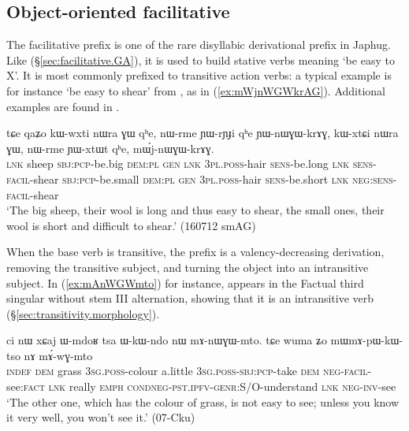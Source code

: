 \subsection{Object-oriented facilitative} \label{sec:facilitative.nWGW}
  
The facilitative   prefix is one of the rare disyllabic derivational prefix in Japhug. Like  (§\ref{sec:facilitative.GA}), it is used to build stative verbs meaning `be easy to X'. It is most commonly prefixed to transitive action verbs: a typical example is for instance  `be easy to shear' from , as in (\ref{ex:mWjnWGWkrAG}). Additional examples are found in . 

\begin{exe}
\ex \label{ex:mWjnWGWkrAG}
\gll tɕe qaʑo kɯ-wxti nɯra ɣɯ qʰe, nɯ-rme ɲɯ-rɲɟi qʰe ɲɯ-nɯɣɯ-krɤɣ, kɯ-xtɕi nɯra ɣɯ, nɯ-rme ɲɯ-xtɯt qʰe, mɯ́j-nɯɣɯ-krɤɣ. \\
\textsc{lnk} sheep \textsc{sbj}:\textsc{pcp}-be.big \textsc{dem}:\textsc{pl} \textsc{gen} \textsc{lnk} \textsc{3pl}.\textsc{poss}-hair \textsc{sens}-be.long \textsc{lnk} \textsc{sens}-\textsc{facil}-shear \textsc{sbj}:\textsc{pcp}-be.small \textsc{dem}:\textsc{pl} \textsc{gen}   \textsc{3pl}.\textsc{poss}-hair \textsc{sens}-be.short \textsc{lnk} \textsc{neg}:\textsc{sens}-\textsc{facil}-shear \\
\glt `The big sheep, their wool is long and thus easy to shear, the small ones, their wool is short and difficult to shear.' (160712 smAG)
\end{exe}  

When the base verb is transitive, the  prefix is a valency-decreasing derivation, removing the transitive subject, and turning the object into an intransitive subject. In (\ref{ex:mAnWGWmto}) for instance,  appears in the Factual third singular without stem III alternation, showing that it is an intransitive verb (§\ref{sec:transitivity.morphology}).

\begin{exe}
\ex \label{ex:mAnWGWmto}
\gll ci nɯ xɕaj ɯ-mdoʁ tsa ɯ-kɯ-ndo nɯ mɤ-nɯɣɯ-mto. tɕe wuma ʑo mɯ\redp{}mɤ-pɯ-kɯ-tso nɤ mɤ́-wɣ-mto \\
\textsc{indef} \textsc{dem} grass \textsc{3sg}.\textsc{poss}-colour a.little \textsc{3sg}.\textsc{poss}-\textsc{sbj}:\textsc{pcp}-take \textsc{dem} \textsc{neg}-\textsc{facil}-see:\textsc{fact} \textsc{lnk} really \textsc{emph} \textsc{cond\redp}{}\textsc{neg}-\textsc{pst}.\textsc{ipfv}-\textsc{genr}:S/O-understand \textsc{lnk} \textsc{neg}-\textsc{inv}-see \\
\glt `The other one, which has the colour of grass, is not easy to see; unless you know it very well, you won't see it.' (07-Cku) 
\end{exe}  

